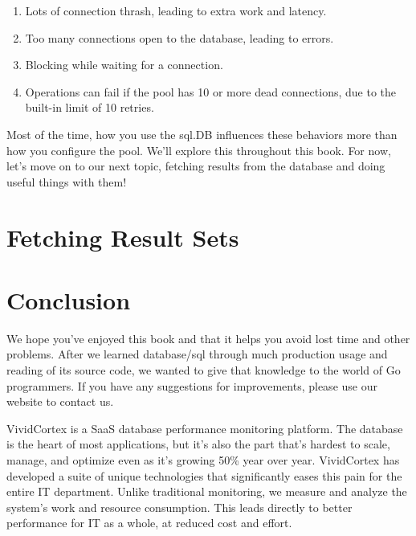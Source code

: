 \documentclass{vivid_layout}
\begin{document}
\begin{enumerate}

	\item Lots of connection thrash, leading to extra work and latency.

	\item Too many connections open to the database, leading to errors.

	\item Blocking while waiting for a connection.

	\item Operations can fail if the pool has 10 or more dead connections, due to the built-in limit of 10 retries.

\end{enumerate}

Most of the time, how you use the sql.DB influences these behaviors more than how you configure the pool. We’ll explore this throughout this book. For now, let’s move on to our next topic, fetching results from the database and doing useful things with them!

\section{Fetching Result Sets}


\section{Conclusion}

We hope you’ve enjoyed this book and that it helps you avoid lost time and other problems. After we learned database/sql through much production usage and reading of its source code, we wanted to give that knowledge to the world of Go programmers. If you have any suggestions for improvements, please use our website to contact us.

\newpage

\begin{about}	%
VividCortex is a SaaS database performance monitoring platform. The database is the heart of most applications, but it's also the part that's hardest to scale, manage, and optimize even as it's growing 50\% year over year. VividCortex has developed a suite of unique technologies that significantly eases this pain for the entire IT department. Unlike traditional monitoring, we measure
and analyze the system's work and resource consumption. This leads directly to better performance for IT as a whole, at reduced cost and effort.
\end{about}
\makeresources	%
\end{document}
